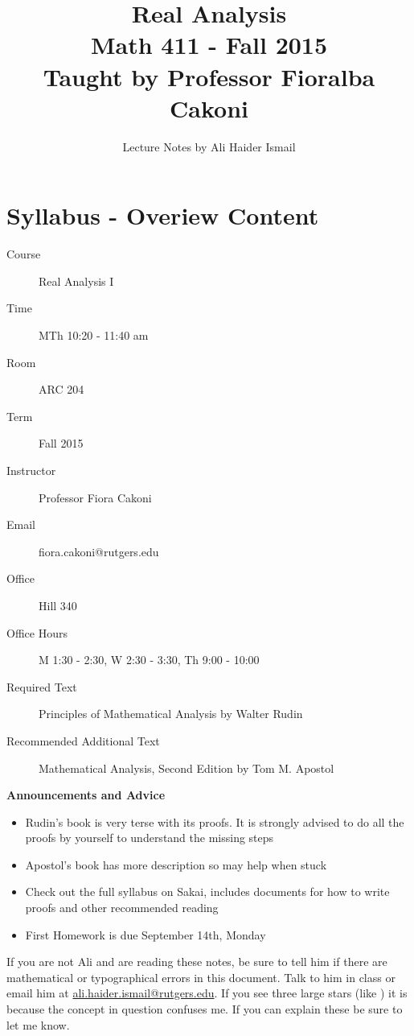 
\setcounter{section}{-1}
\title{
 Real Analysis \\
 Math 411 - Fall 2015 \\
 Taught by Professor Fioralba Cakoni
 }
\author{Lecture Notes by Ali Haider Ismail}
 \date{}


\maketitle
\tableofcontents

\newpage

\section{Syllabus - Overiew Content}

\begin{description}
	\item[Course] Real Analysis I
	\item[Time] MTh 10:20 - 11:40 am
	\item[Room] ARC 204
	\item[Term] Fall 2015
	\item[Instructor] Professor Fiora Cakoni
	\item[Email] fiora.cakoni@rutgers.edu
	\item[Office] Hill 340
	\item[Office Hours] M 1:30 - 2:30, W 2:30 - 3:30, Th 9:00 - 10:00
	\item[Required Text] Principles of Mathematical Analysis by Walter Rudin
	\item[Recommended Additional Text] Mathematical Analysis, Second Edition by Tom M. Apostol
\end{description}

\noindent
\textbf{Announcements and Advice}
\begin{itemize}
	\item Rudin's book is very terse with its proofs. It is strongly advised to do all the
		proofs by yourself to understand the missing steps
	\item Apostol's book has more description so may help when stuck
	\item Check out the full syllabus on Sakai, includes documents for how to write proofs and
		other recommended reading
	\item First Homework is due September 14th, Monday
\end{itemize}

If you are not Ali and are reading these notes, be sure to tell him if there are mathematical or
typographical errors in this document. Talk to him in class or email him at
\href{mailto:ali.haider.ismail@rutgers.edu}{ali.haider.ismail@rutgers.edu}. If you see three
large stars (like \attention{}) it is because the concept in question confuses me. If you can
explain these be sure to let me know.

